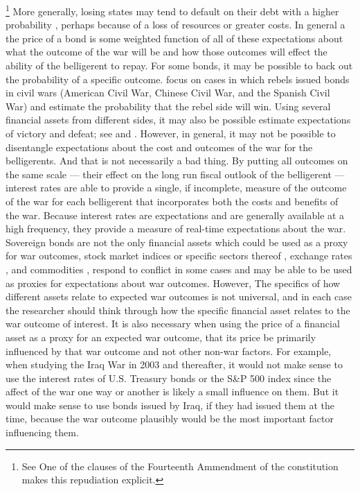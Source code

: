 \footnote{See One of the clauses of the Fourteenth Ammendment of the constitution makes this repudiation explicit. }
More generally, losing states may tend to default on their debt with a higher probability \parencite{Slantchev2012a}, perhaps because of a loss of resources or greater costs.
In general a the price of a bond is some weighted function of all of these expectations about what the outcome of the war will be and how those outcomes will effect the ability of the belligerent to repay.
For some bonds, it may be possible to back out the probability of a specific outcome.
\textcite{HaberMitchenerOosterlinckEtAl2015} focus on cases in which rebels issued bonds in civil wars (American Civil War, Chinese Civil War, and the Spanish Civil War) and estimate the probability that the rebel side will win.
Using several financial assets from different sides, it may also be possible estimate expectations of victory and defeat; see \textcite{Hall2004} and \textcite{McCandless1996}.
However, in general, it may not be possible to disentangle expectations about the cost and outcomes of the war for the belligerents. 
And that is not necessarily a bad thing.
By putting all outcomes on the same scale --- their effect on the long run fiscal outlook of the belligerent --- interest rates are able to provide a single, if incomplete, measure of the outcome of the war for each belligerent that incorporates both the costs and benefits of the war.
Because interest rates are expectations and are generally available at a high frequency, they provide a measure of real-time expectations about the war.
Sovereign bonds are not the only financial assets which could be used as a proxy for war outcomes, stock market indices or specific sectors thereof \textcites{ChenSiems2004}{SchneiderTroeger2006}{WolfersZitzewitz2009}, exchange rates \textcites{Hall2004}, and commodities \textcites{WolfersZitzewitz2009}, respond to conflict in some cases and may be able to be used as proxies for expectations about war outcomes.
However, The specifics of how different assets relate to expected war outcomes is not universal, and in each case the researcher should think through how the specific financial asset relates to the war outcome of interest.%
It is also necessary when using the price of a financial asset as a proxy for an expected war outcome, that its price be primarily influenced by that war outcome and not other non-war factors.
For example, when studying the Iraq War in 2003 and thereafter, it would not make sense to use the interest rates of U.S. Treasury bonds or the S\&P 500 index since the affect of the war one way or another is likely a small influence on them.
But it would make sense to use bonds issued by Iraq, if they had issued them at the time, because the war outcome plausibly would be the most important factor influencing them.

